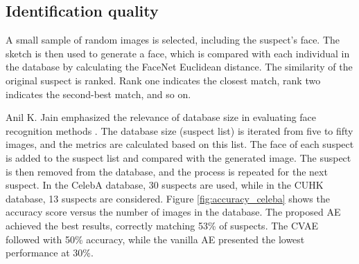 \documentclass{IEEEcsmag}
\begin{document}
\subsection{Identification quality}
\label{subsec:identificationQuality}

A small sample of random images is selected, including the suspect's face. The sketch is then used to generate a face, which is compared with each individual in the database by calculating the FaceNet Euclidean distance. The similarity of the original suspect is ranked. Rank one indicates the closest match, rank two indicates the second-best match, and so on.

Anil K. Jain emphasized the relevance of database size in evaluating face recognition methods \cite{Jain}. The database size (suspect list) is iterated from five to fifty images, and the metrics are calculated based on this list. The face of each suspect is added to the suspect list and compared with the generated image. The suspect is then removed from the database, and the process is repeated for the next suspect. In the CelebA database, 30 suspects are used, while in the CUHK database, 13 suspects are considered. Figure \ref{fig:accuracy_celeba} shows the accuracy score versus the number of images in the database. The proposed AE achieved the best results, correctly matching 53\% of suspects. The CVAE followed with 50\% accuracy, while the vanilla AE presented the lowest performance at 30\%.
\end{document}

